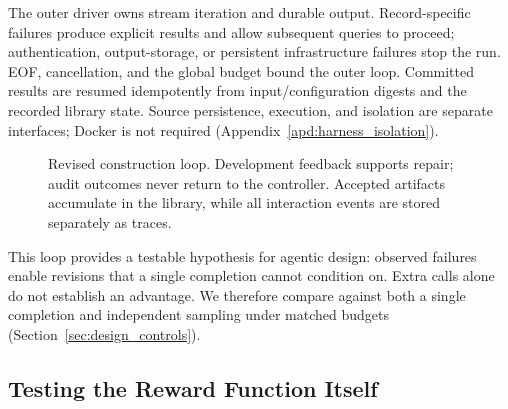 The outer driver owns stream iteration and durable output. Record-specific failures produce explicit results and allow subsequent queries to proceed; authentication, output-storage, or persistent infrastructure failures stop the run. EOF, cancellation, and the global budget bound the outer loop. Committed results are resumed idempotently from input/configuration digests and the recorded library state. Source persistence, execution, and isolation are separate interfaces; Docker is not required (Appendix~\ref{apd:harness_isolation}).

\begin{figure}[t]
\centering
{}
\caption{Revised construction loop. Development feedback supports repair; audit outcomes never return to the controller. Accepted artifacts accumulate in the library, while all interaction events are stored separately as traces.}
\label{fig:main_fig}
\end{figure}

This loop provides a testable hypothesis for agentic design: observed failures enable revisions that a single completion cannot condition on. Extra calls alone do not establish an advantage. We therefore compare against both a single completion and independent sampling under matched budgets (Section~\ref{sec:design_controls}).

\subsection{Testing the Reward Function Itself}
\label{sec:verification}

